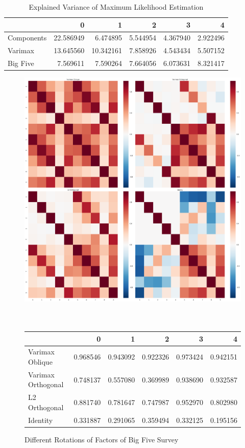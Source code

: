 \documentclass[a4paper,12pt]{article}
\begin{document}
\begin{table}
\begin{tabular}{lrrrrr}
\toprule
{} &          0 &          1 &         2 &         3 &         4 \\
\midrule
Components &  22.586949 &   6.474895 &  5.544954 &  4.367940 &  2.922496 \\
Varimax    &  13.645560 &  10.342161 &  7.858926 &  4.543434 &  5.507152 \\
Big Five   &   7.569611 &   7.590264 &  7.664056 &  6.073631 &  8.321417 \\
\bottomrule
\end{tabular}
\caption{Explained Variance of Maximum Likelihood Estimation}\label{table:ml-variance}
\end{table}

\begin{figure}
\includegraphics[width=\linewidth]{images/grid_bf.png}
\\
\\
\\
\begin{tabular}{lrrrrr}
\toprule
{} &         0 &         1 &         2 &         3 &         4 \\
\midrule
Varimax Oblique    &  0.968546 &  0.943092 &  0.922326 &  0.973424 &  0.942151 \\
Varimax Orthogonal &  0.748137 &  0.557080 &  0.369989 &  0.938690 &  0.932587 \\
L2 Orthogonal      &  0.881740 &  0.781647 &  0.747987 &  0.952970 &  0.802980 \\
Identity           &  0.331887 &  0.291065 &  0.359494 &  0.332125 &  0.195156 \\
\bottomrule
\end{tabular}
\caption{Different Rotations of Factors of Big Five Survey}\label{fig:grid-bf}
\end{figure}
\end{document}
